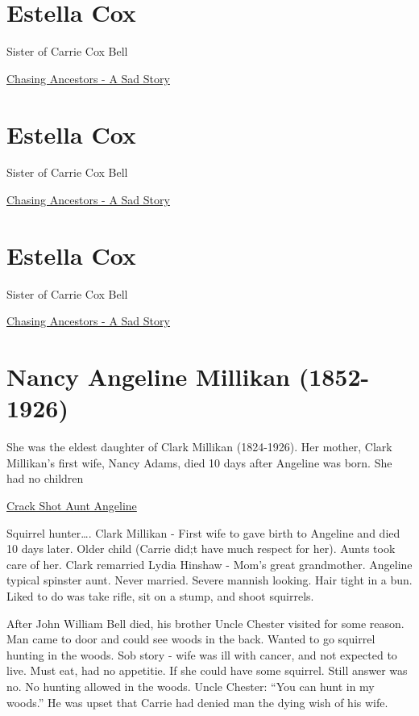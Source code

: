 \documentclass[
]{book}
\begin{document}
\hypertarget{estella-cox-2}{%
\chapter{Estella Cox}\label{estella-cox-2}}

Sister of Carrie Cox Bell

\href{https://chasingancestors.com/2017/03/20/a-sad-story/}{Chasing Ancestors - A Sad Story}

\hypertarget{estella-cox-3}{%
\chapter{Estella Cox}\label{estella-cox-3}}

Sister of Carrie Cox Bell

\href{https://chasingancestors.com/2017/03/20/a-sad-story/}{Chasing Ancestors - A Sad Story}

\hypertarget{estella-cox-4}{%
\chapter{Estella Cox}\label{estella-cox-4}}

Sister of Carrie Cox Bell

\href{https://chasingancestors.com/2017/03/20/a-sad-story/}{Chasing Ancestors - A Sad Story}

\hypertarget{nancy-angeline-millikan-1852-1926}{%
\chapter{Nancy Angeline Millikan (1852-1926)}\label{nancy-angeline-millikan-1852-1926}}

She was the eldest daughter of Clark Millikan (1824-1926). Her mother, Clark Millikan's first wife, Nancy Adams, died 10 days after Angeline was born. She had no children

\href{https://chasingancestors.com/2017/08/01/aunt-angie-crack-shot/}{Crack Shot Aunt Angeline}

Squirrel hunter\ldots. Clark Millikan - First wife to gave birth to Angeline and died 10 days later. Older child (Carrie did;t have much respect for her). Aunts took care of her. Clark remarried Lydia Hinshaw - Mom's great grandmother. Angeline typical spinster aunt. Never married. Severe mannish looking. Hair tight in a bun. Liked to do was take rifle, sit on a stump, and shoot squirrels.

After John William Bell died, his brother Uncle Chester visited for some reason. Man came to door and could see woods in the back. Wanted to go squirrel hunting in the woods. Sob story - wife was ill with cancer, and not expected to live. Must eat, had no appetitie. If she could have some squirrel. Still answer was no. No hunting allowed in the woods. Uncle Chester: ``You can hunt in my woods.'' He was upset that Carrie had denied man the dying wish of his wife.
\end{document}
